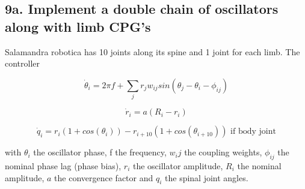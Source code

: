 \documentclass{cmc}
\begin{document}
\subsection*{9a. Implement a double chain of oscillators along with
  limb CPG's}
\label{sec:implement-chain}

Salamandra robotica has 10 joints along its spine and 1 joint for each
limb. The controller

\begin{equation}
  \label{eq:dphase}
  \dot{\theta}_i = 2 \pi f + \sum_j r_j w_{ij} sin(\theta_j - \theta_i - \phi_{ij})
\end{equation}

\begin{equation}
  \label{eq:dr}
  \dot{r}_i = a (R_i - r_i)
\end{equation}

\begin{equation}
  \label{eq:output}
  \dot{q}_i = r_i(1 + cos(\theta_i)) - r_{i+10}(1 + cos(\theta_{i+10})) \text{ if body joint}
\end{equation}

with $ \theta_i $ the oscillator phase, f the frequency, $ w{_ij} $ the coupling
weights, $ \phi_{ij} $ the nominal phase lag (phase bias), $ r_i $ the
oscillator amplitude, $ R_i $ the nominal amplitude, $ a $ the convergence
factor and $ q_i $ the spinal joint angles.
\end{document}
